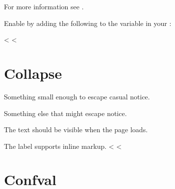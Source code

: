 \documentclass[letterpaper,10pt,english]{sphinxmanual}
\begin{document}
\label{\detokenize{installation:extensions-4}}

\begin{sphinxVerbatim}[commandchars=\\\{\}]
  \PYG{p}{[}
    \PYG{p}{]}
\end{sphinxVerbatim}
\begin{flushleft}
For more information see  .
\end{flushleft}

\label{\detokenize{installation:extensions-5}}

\vspace{10px}

Enable  by adding the following
to the  variable in your :

\begin{sphinxVerbatim}[commandchars=\\\{\}]
  \PYG{p}{[}
    \PYG{p}{]}
\end{sphinxVerbatim}

<%
\sphinxstepscope
<%

\chapter{Collapse}
\label{\detokenize{collapse:collapse}}\label{\detokenize{collapse:collapse-heading}}\label{\detokenize{collapse::doc}}
Something small enough to escape casual notice.

Something else that might escape notice.

The text should be visible when the page loads.

The label supports inline markup.
<%
\sphinxstepscope
<%

\chapter{Confval}
\label{\detokenize{confval:confval}}\label{\detokenize{confval::doc}}
\end{document}
